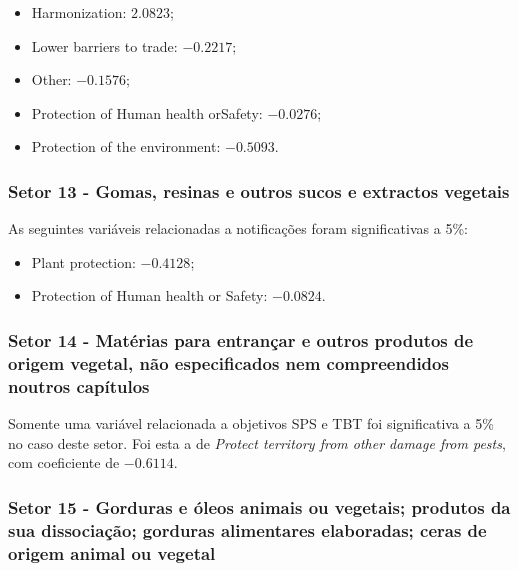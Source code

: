 \begin{itemize}
    \item Harmonization: $2.0823$;
    \item Lower barriers to trade: $-0.2217$;
    \item Other: $-0.1576$;
    \item Protection of Human health orSafety: $-0.0276$;
    \item Protection of the environment: $-0.5093$.
\end{itemize}

\subsubsection{Setor 13 - Gomas, resinas e outros sucos e extractos vegetais}




As seguintes variáveis relacionadas a notificações foram significativas a 5\%:

\begin{itemize}
    \item Plant protection: $-0.4128$;
    \item Protection of Human health or Safety: $-0.0824$.
\end{itemize}

\newpage

\subsubsection{Setor 14 - Matérias para entrançar e outros produtos de origem vegetal, não especificados nem compreendidos noutros capítulos}




Somente uma variável relacionada a objetivos SPS e TBT foi significativa a 5\% no caso deste setor. Foi esta a de \emph{Protect territory from other damage from pests}, com coeficiente de $-0.6114$.

\newpage

\subsubsection{Setor 15 - Gorduras e óleos animais ou vegetais; produtos da sua dissociação; gorduras alimentares elaboradas; ceras de origem animal ou vegetal}


 

